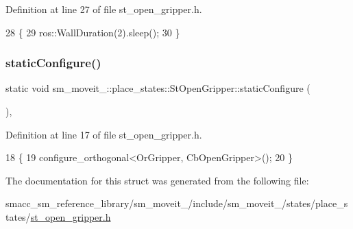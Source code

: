 Definition at line 27 of file st\+\_\+open\+\_\+gripper.\+h.


\begin{DoxyCode}
28             \{
29                 ros::WallDuration(2).sleep();
30             \}
\end{DoxyCode}
\mbox{\label{structsm__moveit__4_1_1place__states_1_1StOpenGripper_a83a52c51baf50a5519763fcf7a5f5a22}} 
\subsubsection{\texorpdfstring{static\+Configure()}{staticConfigure()}}
{\footnotesize\ttfamily static void sm\+\_\+moveit\+\_\+::place\+\_\+states\+::\+St\+Open\+Gripper\+::static\+Configure (\begin{DoxyParamCaption}{ }\end{DoxyParamCaption})\hspace{0.3cm}{\ttfamily [inline]}, {\ttfamily [static]}}



Definition at line 17 of file st\+\_\+open\+\_\+gripper.\+h.


\begin{DoxyCode}
18             \{
19                 configure\_orthogonal<OrGripper, CbOpenGripper>();
20             \}
\end{DoxyCode}


The documentation for this struct was generated from the following file\+:\begin{DoxyCompactItemize}
\item 
smacc\+\_\+sm\+\_\+reference\+\_\+library/sm\+\_\+moveit\+\_/include/sm\+\_\+moveit\+\_/states/place\+\_\+states/\hyperlink{4_2include_2sm__moveit__4_2states_2place__states_2st__open__gripper_8h}{st\+\_\+open\+\_\+gripper.\+h}\end{DoxyCompactItemize}
